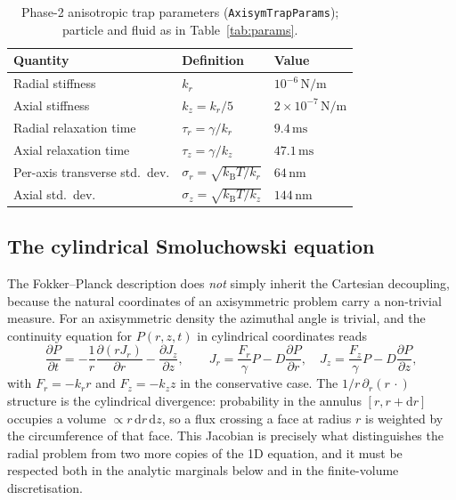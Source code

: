 \documentclass[11pt]{article}
\newcommand{\dd}{\mathrm{d}}
\newcommand{\pdv}[2]{\dfrac{\partial #1}{\partial #2}}
\newcommand{\kB}{k_{\mathrm{B}}}
\begin{document}
\begin{table}[h]
\centering
\begin{tabular}{@{}lll@{}}
\toprule
Quantity & Definition & Value \\
\midrule
Radial stiffness & $k_r$ & $10^{-6}\,\mathrm{N/m}$ \\
Axial stiffness & $k_z = k_r/5$ & $2\times10^{-7}\,\mathrm{N/m}$ \\
Radial relaxation time & $\tau_r = \gamma/k_r$ & $9.4\,\mathrm{ms}$ \\
Axial relaxation time & $\tau_z = \gamma/k_z$ & $47.1\,\mathrm{ms}$ \\
Per-axis transverse std.\ dev. & $\sigma_r = \sqrt{\kB T/k_r}$ & $64\,\mathrm{nm}$ \\
Axial std.\ dev. & $\sigma_z = \sqrt{\kB T/k_z}$ & $144\,\mathrm{nm}$ \\
\bottomrule
\end{tabular}
\caption{Phase-2 anisotropic trap parameters (\texttt{AxisymTrapParams}); particle and fluid as in Table~\ref{tab:params}.}
\label{tab:params2}
\end{table}

\subsection{The cylindrical Smoluchowski equation}

The Fokker--Planck description does \emph{not} simply inherit the Cartesian decoupling, because the natural coordinates of an axisymmetric problem carry a non-trivial measure. For an axisymmetric density the azimuthal angle is trivial, and the continuity equation for $P(r,z,t)$ in cylindrical coordinates reads
\begin{equation}
\pdv{P}{t} = -\frac{1}{r}\pdv{(r J_r)}{r} - \pdv{J_z}{z},
\qquad
J_r = \frac{F_r}{\gamma}P - D\pdv{P}{r}, \quad
J_z = \frac{F_z}{\gamma}P - D\pdv{P}{z},
\label{eq:fp-axisym}
\end{equation}
with $F_r = -k_r r$ and $F_z = -k_z z$ in the conservative case. The $1/r\,\partial_r(r\,\cdot)$ structure is the cylindrical divergence: probability in the annulus $[r, r+\dd r]$ occupies a volume $\propto r\,\dd r\,\dd z$, so a flux crossing a face at radius $r$ is weighted by the circumference of that face. This Jacobian is precisely what distinguishes the radial problem from two more copies of the 1D equation, and it must be respected both in the analytic marginals below and in the finite-volume discretisation.
\end{document}
